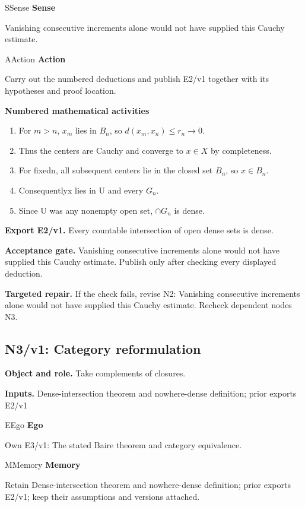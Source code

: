 \documentclass[preprint,12pt,aps,pra,showkeys,amsmath,amssymb,superscriptaddress,floatfix]{revtex4-2}
\theoremstyle{definition}
\theoremstyle{remark}
\newcommand{\mmfaculty}[3]{%
 \begin{mmfacultybox}{#1}{#2}
 {\sffamily\bfseries\color{MMBlue}#2}\par\smallskip #3
 \end{mmfacultybox}}
\newcommand{\field}[2]{\par\smallskip\noindent\textbf{#1.} #2\par}
\begin{document}
\mmfaculty{S}{Sense}{Vanishing consecutive increments alone would not have supplied this
Cauchy estimate.}

\mmfaculty{A}{Action}{Carry out the numbered deductions and publish E2/v1 together with its
hypotheses and proof location.}

\smallskip\noindent\textbf{Numbered mathematical activities}

\begin{enumerate}[label=N2.\arabic*,leftmargin=3.4em]

\item For \(m>n\), \(x_m\) lies in \(B_n\), so \(d(x_m,x_n)\le r_n\to 0\).

\item Thus the centers are Cauchy and converge to \(x\in X\) by completeness.

\item For fixedn, all subsequent centers lie in the closed set \(B_n\), so
\(x\in B_n\).

\item Consequentlyx lies in U and every \(G_n\).

\item Since U was any nonempty open set, \(\cap G_n\) is dense.

\end{enumerate}

\field{Export E2/v1}{Every countable intersection of open dense sets is dense.}

\field{Acceptance gate}{Vanishing consecutive increments alone would not have supplied this
Cauchy estimate. Publish only after checking every displayed deduction.}

\field{Targeted repair}{If the check fails, revise N2: Vanishing consecutive increments alone
would not have supplied this Cauchy estimate. Recheck dependent nodes
N3.}

\clearpage

\subsection{N3/v1: Category reformulation}

\field{Object and role}{Take complements of closures.}

\field{Inputs}{Dense-intersection theorem and nowhere-dense definition; prior exports
E2/v1}

\mmfaculty{E}{Ego}{Own E3/v1: The stated Baire theorem and category equivalence.}

\mmfaculty{M}{Memory}{Retain Dense-intersection theorem and nowhere-dense definition; prior
exports E2/v1; keep their assumptions and versions attached.}
\end{document}
